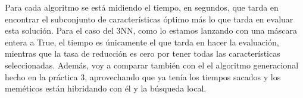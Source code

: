 \documentclass[12pt]{article}
\begin{document}
Para cada algoritmo se está midiendo el tiempo, en segundos, que tarda en encontrar el subconjunto de características óptimo más lo que tarda en evaluar esta solución. Para el caso del 3NN, como lo estamos lanzando con una máscara entera a True, el tiempo es únicamente el que tarda en hacer la evaluación, mientras que la tasa de reducción es cero por tener todas las características seleccionadas. Además, voy a comparar también con el el algoritmo generacional hecho en la práctica 3, aprovechando que ya tenía los tiempos sacados y los meméticos están hibridando con él y la búsqueda local.

\begin{table}[H]
\centering
\caption{Resultados SFS}
\label{Resultados SFS}
\end{table}
\end{document}
